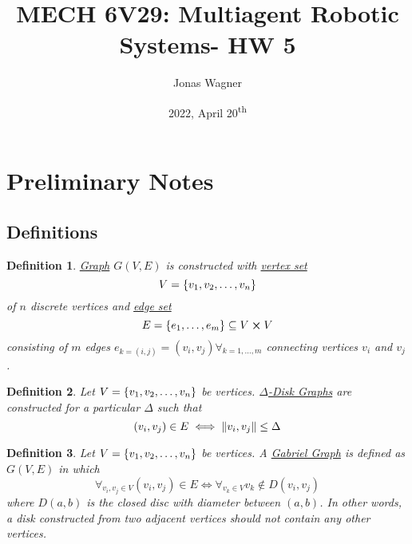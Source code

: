 \documentclass[]{article}
\title{MECH 6V29: Multiagent Robotic Systems- HW 5}
\author{Jonas Wagner}
\date{2022, April 20\textsuperscript{th}}
\numberwithin{equation}{section}
\newtheorem{definition}{Definition}
\begin{document}
	

\maketitle

\tableofcontents

\newpage
\section*{Preliminary Notes}

\subsection{Definitions}
\begin{definition} \label{def:graph_def}
	\underline{\emph{Graph}} $G(V,E)$ is constructed with \underline{\emph{vertex set}} \[
		V = \qty{v_1,v_2,\dots,v_n}
	\] of $n$ discrete vertices and \emph{\underline{edge set}} \[
		E = \qty{e_1, \dots, e_m} \subseteq V \cross V
	\] consisting of $m$ edges $e_{k=(i,j)} = (v_i,v_j) \forall_{k=1,\dots,m}$ connecting vertices $v_i$ and $v_j$.
\end{definition}

\begin{definition}\label{def:Delta-disk_graph}
	Let $V = \qty{v_1,v_2,\dots,v_n}$ be vertices.
	\emph{\underline{$\Delta$-Disk Graphs}} are constructed for a particular $\Delta$ such that \[
		(v_i,v_j) \in E \iff \norm{v_i,v_j} \leq \Delta
	\]
\end{definition}

\begin{definition}\label{def:Gabriel_graph}
	Let $V = \qty{v_1,v_2,\dots,v_n}$ be vertices.
	A \emph{\underline{Gabriel Graph}} is defined as $G(V,E)$ in which \[
        \forall_{v_i, v_j \in V} (v_i,v_j) \in E \iff \forall_{v_k \in V} v_k \notin D(v_i,v_j)
    \] where $D(a,b)$ is the closed disc with diameter between $(a,b)$.
    In other words, a disk constructed from two adjacent vertices should not contain any other vertices.
\end{definition}
\end{document}
